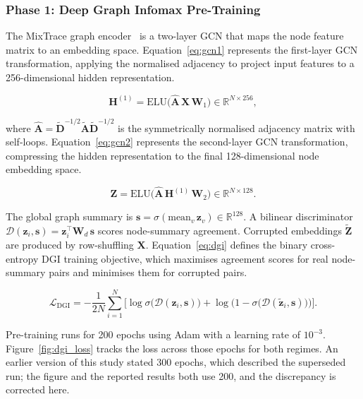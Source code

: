 \documentclass[12pt,a4paper]{article}
\begin{document}
\subsubsection{Phase 1: Deep Graph Infomax Pre-Training}

The MixTrace graph encoder~\citep{velickovic2019dgi} is a
two-layer GCN that maps the node feature matrix to an
embedding space. Equation~\eqref{eq:gcn1} represents the
first-layer GCN transformation, applying the normalised
adjacency to project input features to a 256-dimensional
hidden representation.

\begin{equation}
  \mathbf{H}^{(1)} = \text{ELU}\!\bigl(
    \hat{\mathbf{A}}\,\mathbf{X}\,\mathbf{W}_1\bigr)
    \in \mathbb{R}^{N \times 256},
  \label{eq:gcn1}
\end{equation}

where $\hat{\mathbf{A}} = \tilde{\mathbf{D}}^{-1/2}
\tilde{\mathbf{A}}\tilde{\mathbf{D}}^{-1/2}$ is the
symmetrically normalised adjacency matrix with self-loops.
Equation~\eqref{eq:gcn2} represents the second-layer GCN
transformation, compressing the hidden representation to
the final 128-dimensional node embedding space.

\begin{equation}
  \mathbf{Z} = \text{ELU}\!\bigl(
    \hat{\mathbf{A}}\,\mathbf{H}^{(1)}\,\mathbf{W}_2\bigr)
    \in \mathbb{R}^{N \times 128}.
  \label{eq:gcn2}
\end{equation}

The global graph summary is $\mathbf{s} =
\sigma(\text{mean}_v\,\mathbf{z}_v) \in \mathbb{R}^{128}$.
A bilinear discriminator $\mathcal{D}(\mathbf{z}_i,
\mathbf{s}) = \mathbf{z}_i^\top \mathbf{W}_d\, \mathbf{s}$
scores node-summary agreement. Corrupted embeddings
$\tilde{\mathbf{Z}}$ are produced by row-shuffling
$\mathbf{X}$. Equation~\eqref{eq:dgi} defines the binary
cross-entropy DGI training objective, which maximises
agreement scores for real node-summary pairs and minimises
them for corrupted pairs.

\begin{equation}
  \mathcal{L}_\text{DGI} = -\frac{1}{2N}
    \sum_{i=1}^{N}\!\bigl[
      \log\sigma\!\bigl(\mathcal{D}(\mathbf{z}_i,
        \mathbf{s})\bigr)
      + \log\!\bigl(1 - \sigma\!\bigl(
          \mathcal{D}(\tilde{\mathbf{z}}_i,
          \mathbf{s})\bigr)\bigr)
    \bigr].
  \label{eq:dgi}
\end{equation}

Pre-training runs for 200 epochs using Adam with a learning
rate of $10^{-3}$. Figure~\ref{fig:dgi_loss} tracks the loss
across those epochs for both regimes. An earlier version of this
study stated 300 epochs, which described the superseded run; the
figure and the reported results both use 200, and the
discrepancy is corrected here.
\end{document}

